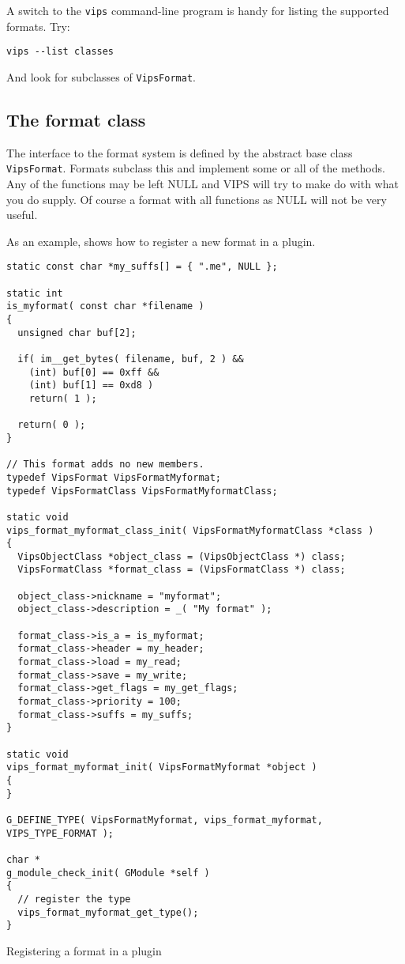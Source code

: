 A switch to the \verb+vips+ command-line program is handy for listing the
supported formats. Try:

\begin{verbatim}
vips --list classes
\end{verbatim}

\noindent
And look for subclasses of \verb+VipsFormat+.

\subsection{The format class}

The interface to the format system is defined by the abstract base class
\verb+VipsFormat+. Formats subclass this and implement some or all of the
methods. Any of the functions may be left NULL and VIPS will try to make do 
with what you do supply. Of course a format with all functions as NULL will 
not be very useful.

As an example,  shows how to register a new format in a
plugin.

\begin{fig2}
\begin{verbatim}
static const char *my_suffs[] = { ".me", NULL };

static int
is_myformat( const char *filename )
{
  unsigned char buf[2];

  if( im__get_bytes( filename, buf, 2 ) &&
    (int) buf[0] == 0xff && 
    (int) buf[1] == 0xd8 )
    return( 1 );

  return( 0 );
}

// This format adds no new members.
typedef VipsFormat VipsFormatMyformat;
typedef VipsFormatClass VipsFormatMyformatClass;

static void
vips_format_myformat_class_init( VipsFormatMyformatClass *class )
{
  VipsObjectClass *object_class = (VipsObjectClass *) class;
  VipsFormatClass *format_class = (VipsFormatClass *) class;

  object_class->nickname = "myformat";
  object_class->description = _( "My format" );

  format_class->is_a = is_myformat;
  format_class->header = my_header;
  format_class->load = my_read;
  format_class->save = my_write;
  format_class->get_flags = my_get_flags;
  format_class->priority = 100;
  format_class->suffs = my_suffs;
}

static void
vips_format_myformat_init( VipsFormatMyformat *object )
{
}

G_DEFINE_TYPE( VipsFormatMyformat, vips_format_myformat, VIPS_TYPE_FORMAT );

char *
g_module_check_init( GModule *self )
{
  // register the type
  vips_format_myformat_get_type(); 
}
\end{verbatim}
\caption{Registering a format in a plugin}
\label{fg:newformat}
\end{fig2}

